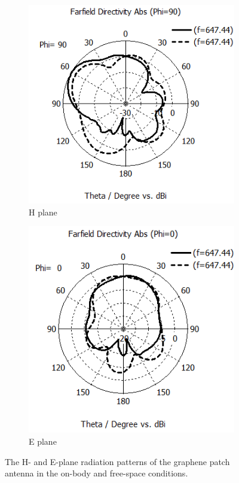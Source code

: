 \documentclass[12pt]{suhbook}
\begin{document}
\begin{figure}[hbt!]
\begin{subfigure}{.4\textwidth}
\centering
\includegraphics[width=.9\linewidth]{13}
\caption{H plane}
\label{fig:sfig10a}
\end{subfigure}%
\begin{subfigure}{.4\textwidth}
  \centering
  \includegraphics[width=.9\linewidth]{14}
  \caption{E plane}
  \label{fig:sfig2}
\end{subfigure}
\caption{The H- and E-plane radiation patterns of the graphene patch antenna in the on-body and free-space conditions.}
\label{fig 14b}
\end{figure}
\end{document}
